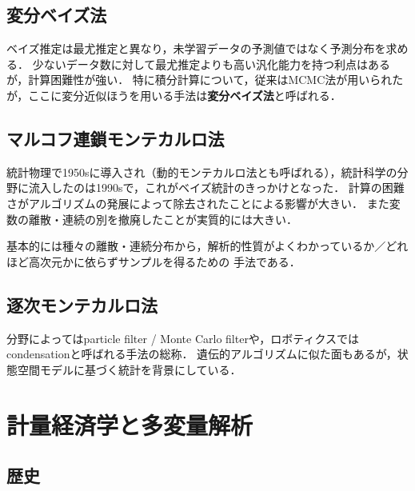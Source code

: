 \documentclass[uplatex,dvipdfmx]{jsreport}
\begin{document}
\section{変分ベイズ法}

\begin{history}
    ベイズ推定は最尤推定と異なり，未学習データの予測値ではなく予測分布を求める．
    少ないデータ数に対して最尤推定よりも高い汎化能力を持つ利点はあるが，計算困難性が強い．
    特に積分計算について，従来はMCMC法が用いられたが，ここに変分近似ほうを用いる手法は\textbf{変分ベイズ法}と呼ばれる．
\end{history}

\section{マルコフ連鎖モンテカルロ法}

\begin{history}
    統計物理で1950sに導入され（動的モンテカルロ法とも呼ばれる），統計科学の分野に流入したのは1990sで，これがベイズ統計のきっかけとなった．
    計算の困難さがアルゴリズムの発展によって除去されたことによる影響が大きい．
    また変数の離散・連続の別を撤廃したことが実質的には大きい．
\end{history}

基本的には種々の離散・連続分布から，解析的性質がよくわかっているか／どれほど高次元かに依らずサンプルを得るための
手法である．

\section{逐次モンテカルロ法}

\begin{history}
    分野によってはparticle filter / Monte Carlo filterや，ロボティクスではcondensationと呼ばれる手法の総称．
    遺伝的アルゴリズムに似た面もあるが，状態空間モデルに基づく統計を背景にしている．
\end{history}

\chapter{計量経済学と多変量解析}

\section{歴史}
\end{document}
